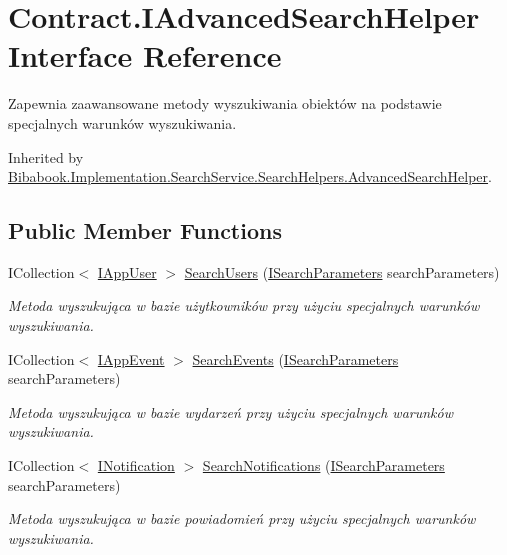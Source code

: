 \hypertarget{interface_contract_1_1_i_advanced_search_helper}{}\section{Contract.\+I\+Advanced\+Search\+Helper Interface Reference}
\label{interface_contract_1_1_i_advanced_search_helper}


Zapewnia zaawansowane metody wyszukiwania obiektów na podstawie specjalnych warunków wyszukiwania.  




Inherited by \hyperlink{class_bibabook_1_1_implementation_1_1_search_service_1_1_search_helpers_1_1_advanced_search_helper}{Bibabook.\+Implementation.\+Search\+Service.\+Search\+Helpers.\+Advanced\+Search\+Helper}.

\subsection*{Public Member Functions}
\begin{DoxyCompactItemize}
\item 
I\+Collection$<$ \hyperlink{interface_contract_1_1_i_app_user}{I\+App\+User} $>$ \hyperlink{interface_contract_1_1_i_advanced_search_helper_aabbc690898bb9d0cbfa8e62a32be42e8}{Search\+Users} (\hyperlink{interface_contract_1_1_i_search_parameters}{I\+Search\+Parameters} search\+Parameters)
\begin{DoxyCompactList}\small\item\em Metoda wyszukująca w bazie użytkowników przy użyciu specjalnych warunków wyszukiwania. \end{DoxyCompactList}\item 
I\+Collection$<$ \hyperlink{interface_contract_1_1_i_app_event}{I\+App\+Event} $>$ \hyperlink{interface_contract_1_1_i_advanced_search_helper_a679972d9667e4794346a17230bd85f02}{Search\+Events} (\hyperlink{interface_contract_1_1_i_search_parameters}{I\+Search\+Parameters} search\+Parameters)
\begin{DoxyCompactList}\small\item\em Metoda wyszukująca w bazie wydarzeń przy użyciu specjalnych warunków wyszukiwania. \end{DoxyCompactList}\item 
I\+Collection$<$ \hyperlink{interface_contract_1_1_i_notification}{I\+Notification} $>$ \hyperlink{interface_contract_1_1_i_advanced_search_helper_aa790307ab1ce0dfe56c2370108abc80a}{Search\+Notifications} (\hyperlink{interface_contract_1_1_i_search_parameters}{I\+Search\+Parameters} search\+Parameters)
\begin{DoxyCompactList}\small\item\em Metoda wyszukująca w bazie powiadomień przy użyciu specjalnych warunków wyszukiwania. \end{DoxyCompactList}\end{DoxyCompactItemize}


